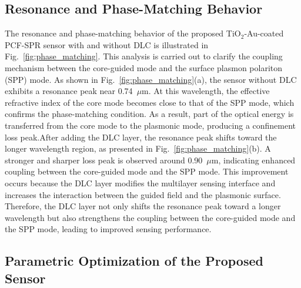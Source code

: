 \documentclass[preprint,12pt]{elsarticle}
\begin{document}
\subsection{\textbf{{Resonance and Phase-Matching Behavior}}}

The resonance and phase-matching behavior of the proposed TiO$_2$-Au-coated PCF-SPR sensor with and without DLC is illustrated in Fig.~\ref{fig:phase_matching}. This analysis is carried out to clarify the coupling mechanism between the core-guided mode and the surface plasmon polariton (SPP) mode. As shown in Fig.~\ref{fig:phase_matching}(a), the sensor without DLC exhibits a resonance peak near 0.74~$\mu$m. At this wavelength, the effective refractive index of the core mode becomes close to that of the SPP mode, which confirms the phase-matching condition. As a result, part of the optical energy is transferred from the core mode to the plasmonic mode, producing a confinement loss peak.After adding the DLC layer, the resonance peak shifts toward the longer wavelength region, as presented in Fig.~\ref{fig:phase_matching}(b). A stronger and sharper loss peak is observed around 0.90~$\mu$m, indicating enhanced coupling between the core-guided mode and the SPP mode. This improvement occurs because the DLC layer modifies the multilayer sensing interface and increases the interaction between the guided field and the plasmonic surface. Therefore, the DLC layer not only shifts the resonance peak toward a longer wavelength but also strengthens the coupling between the core-guided mode and the SPP mode, leading to improved sensing performance.


\subsection{\textbf{Parametric Optimization of the Proposed Sensor}}
\end{document}
